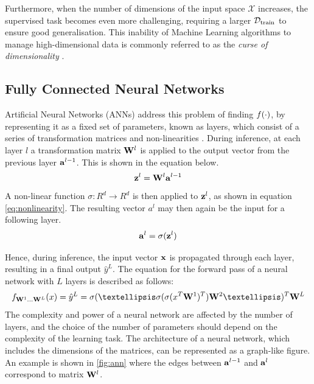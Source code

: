 		Furthermore, when the number of dimensions of the input space $\mathcal{X}$ increases, the supervised task becomes even more challenging, requiring a larger $\mathcal{D}_{\text{train}}$ to ensure good generalisation. This inability of Machine Learning algorithms to manage high-dimensional data is commonly referred to as the \textit{curse of dimensionality} \citep{rustUsingRandomizationBreak1997, aremuMachineLearningApproach2020, stuartrussellArtificialIntelligenceModern2022}.
		
	\subsection{Fully Connected Neural Networks}
			Artificial Neural Networks (ANNs) address this problem of finding $f(\cdot)$, by representing it as a fixed set of parameters, known as layers, which consist of a series of transformation matrices and non-linearities \citep{jainArtificialNeuralNetworks1996, kroghWhatAreArtificial2008, zhangArtificialNeuralNetwork2018}. During inference, at each layer $l$ a transformation matrix $\mathbf{W}^l$ is applied to the output vector from the previous layer $\mathbf{a}^{l-1}$. This is shown in the equation below.
			$$ \mathbf{z}^l = \mathbf{W}^l \mathbf{a}^{l-1} $$
			A non-linear function $\sigma: R^d \rightarrow R^d$ is then applied to $\mathbf{z}^{l}$, as shown in equation \ref{eq:nonlinearity}. The resulting vector $a^l$ may then again be the input for a following layer.
			$$
				\mathbf{a}^l = \sigma(\mathbf{z}^{l})	\label{eq:nonlinearity}
			$$
			
			Hence, during inference, the input vector $\mathbf{x}$ is propagated through each layer, resulting in a final output $\hat{y}^L$. The equation for the forward pass of a neural network with $L$ layers is described as follows: 	
			$$
				f_{\W^1 \dots \W^L}(x) = \hat{y}^L = \sigma(… \sigma( \sigma( x^T \W^1 )^T) \W^2 …)^T \W^L \label{eq:forward_pass}
			$$
			The complexity and power of a neural network are affected by the number of layers, and the choice of the number of parameters should depend on the complexity of the learning task. The architecture of a neural network, which includes the dimensions of the matrices, can be represented as a graph-like figure. An example is shown in \ref{fig:ann} where the edges between $\mathbf{a}^{l-1}$ and $\mathbf{a}^{l}$ correspond to matrix $\mathbf{W}^l$.
	
			
	
